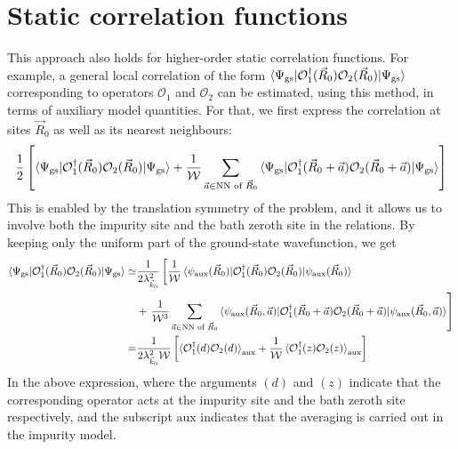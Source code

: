 \documentclass{report}
\numberwithin{equation}{section}
\begin{document}
\section{Static correlation functions}
This approach also holds for higher-order static correlation functions. For example, a general local correlation of the form \(\braket{\Psi_\text{gs} | \mathcal{O}_1^\dagger(\vec R_0) \mathcal{O}_2(\vec R_0) | \Psi_\text{gs}}\) corresponding to operators \(\mathcal{O}_1\) and \(\mathcal{O}_2\) can be estimated, using this method, in terms of auxiliary model quantities. For that, we first express the correlation at sites \(\vec R_0\) as well as its nearest neighbours: 
\begin{equation}\begin{aligned}
	\frac{1}{2}\left[\braket{\Psi_\text{gs} | \mathcal{O}_1^\dagger(\vec R_0) \mathcal{O}_2(\vec R_0) | \Psi_\text{gs}} + \frac{1}{\mathcal{W}}\sum_{\vec a \in \text{NN of }\vec R_0}\braket{\Psi_\text{gs} | \mathcal{O}_1^\dagger(\vec R_0 + \vec a) \mathcal{O}_2(\vec R_0 + \vec a) | \Psi_\text{gs}}\right]
\end{aligned}\end{equation}
This is enabled by the translation symmetry of the problem, and it allows us to involve both the impurity site and the bath zeroth site in the relations. By keeping only the uniform part of the ground-state wavefunction, we get
\begin{equation}\begin{aligned}
	\label{local_correlation}
	\braket{\Psi_\text{gs} | \mathcal{O}_1^\dagger(\vec R_0) \mathcal{O}_2(\vec R_0) | \Psi_\text{gs}} \simeq& \frac{1}{2\lambda_{\vec k_0}^2}\left[\frac{1}{\mathcal{W} }\braket{\psi_\text{aux}(\vec R_0) | \mathcal{O}_1^\dagger(\vec R_0) \mathcal{O}_2(\vec R_0) | \psi_\text{aux}(\vec R_0)} \right. \\
													   &+ \left.\frac{1}{\mathcal{W}^3}\sum_{\vec a \in \text{NN of }\vec R_0}\braket{\psi_\text{aux}(\vec R_0, \vec a) | \mathcal{O}_1^\dagger(\vec R_0 + \vec a) \mathcal{O}_2(\vec R_0 + \vec a) | \psi_\text{aux}(\vec R_0, \vec a)}\right]\\
	=& \frac{1}{2\lambda_{\vec k_0}^2 \mathcal{W}}\left[\braket{\mathcal{O}_1^\dagger(d) \mathcal{O}_2(d)}_\text{aux} + \frac{1}{\mathcal{W}}\braket{\mathcal{O}_1^\dagger(z) \mathcal{O}_2(z)}_\text{aux}\right]
\end{aligned}\end{equation}
In the above expression, where the arguments \((d)\) and \((z)\) indicate that the corresponding operator acts at the impurity site and the bath zeroth site respectively, and the subscript \(\text{aux}\) indicates that the averaging is carried out in the impurity model.
\end{document}
